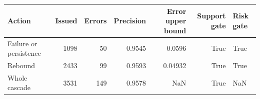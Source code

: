 \begin{tabular}{lrrrrrl}
\toprule
Action & Issued & Errors & Precision & Error upper bound & Support gate & Risk gate \\
\midrule
Failure or persistence & 1098 & 50 & 0.9545 & 0.0596 & True & True \\
Rebound & 2433 & 99 & 0.9593 & 0.04932 & True & True \\
Whole cascade & 3531 & 149 & 0.9578 & NaN & True & NaN \\
\bottomrule
\end{tabular}
